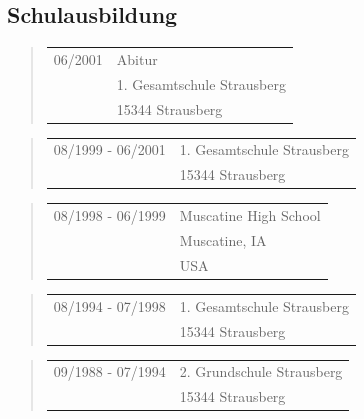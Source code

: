 \subsection*{Schulausbildung}
\begin{quote}
	\begin{tabular}{p{4cm}l}
		06/2001&Abitur\\
		&1. Gesamtschule Strausberg\\
		&15344 Strausberg		
	\end{tabular}
\end{quote}		
\begin{quote}
	\begin{tabular}{p{4cm}l}
		08/1999 - 06/2001&1. Gesamtschule Strausberg\\
		&15344 Strausberg
	\end{tabular}
\end{quote}		
\begin{quote}
	\begin{tabular}{p{4cm}l}
		08/1998 - 06/1999&Muscatine High School\\
		&Muscatine, IA\\
		&USA
	\end{tabular}
\end{quote}
\begin{quote}
	\begin{tabular}{p{4cm}l}
		08/1994 - 07/1998&1. Gesamtschule Strausberg\\
		&15344 Strausberg
	\end{tabular}
\end{quote}
\begin{quote}
	\begin{tabular}{p{4cm}l}
		09/1988 - 07/1994&2. Grundschule Strausberg\\
		&15344 Strausberg
	\end{tabular}
\end{quote}